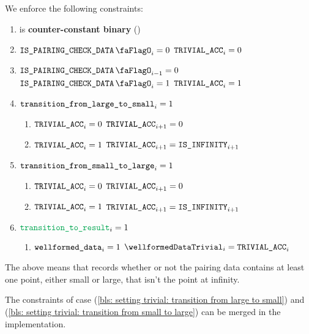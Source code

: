 
We enforce the following constraints:
\begin{enumerate}
    \item \trivialAcc{} is \textbf{counter-constant binary} \quad (\trash)
    \item \If $\isBlsPairingCheckData_{i} = 0$ \Then $\texttt{TRIVIAL\_ACC} _{i} = 0$
    \item \If $\isBlsPairingCheckData_{i - 1} = 0$ \et $\isBlsPairingCheckData _{i} = 1$ \Then $\texttt{TRIVIAL\_ACC}_{i} = 1$
    \item \label{bls: setting trivial: transition from large to small} \If $\texttt{transition\_from\_large\_to\_small}_{i} = 1$ \Then 
          \begin{enumerate}
              \item \If $\texttt{TRIVIAL\_ACC} _{i} = 0$ \Then $\texttt{TRIVIAL\_ACC} _{i + 1} = 0$
              \item \If $\texttt{TRIVIAL\_ACC} _{i} = 1$ \Then $\texttt{TRIVIAL\_ACC} _{i + 1} = \texttt{IS\_INFINITY}_{i + 1}$
          \end{enumerate}
    \item \label{bls: setting trivial: transition from small to large} \If $\texttt{transition\_from\_small\_to\_large}_{i} = 1$ \Then
          \begin{enumerate}
              \item \If $\texttt{TRIVIAL\_ACC} _{i} = 0$ \Then $\texttt{TRIVIAL\_ACC} _{i + 1} = 0$
              \item \If $\texttt{TRIVIAL\_ACC} _{i} = 1$ \Then $\texttt{TRIVIAL\_ACC} _{i + 1} = \texttt{IS\_INFINITY}_{i + 1}$
          \end{enumerate}
    \item \If $\locTransitionToResult_{i} = 1$ \Then 
    \begin{enumerate}
        \item \label{bls: setting trivial: set wellformed data flags}  \If $\texttt{wellformed\_data}_{i} = 1$ \Then $\wellformedDataTrivial_{i} = \trivialAcc_{i}$
    \end{enumerate} 
\end{enumerate}
\saNote{} The above means that \trivialAcc{} records whether or not the pairing data contains at least one point, either small or large, that isn't the point at infinity.

\saNote{} The constraints of case (\ref{bls: setting trivial: transition from large to small}) and (\ref{bls: setting trivial: transition from small to large}) can be merged in the implementation.

